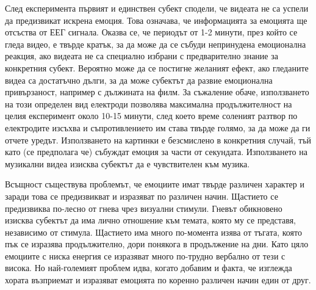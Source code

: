 \documentclass[main.tex]{subfiles}
\begin{document}
След експеримента първият и единствен субект сподели, че видеата не са успели да предизвикат искрена емоция. Това означава, че информацията за емоцията ще отсъства от ЕЕГ сигнала. Оказва се, че периодът от 1-2 минути, през който се гледа видео, е твърде кратък, за да може да се събуди непринудена емоционална реакция, ако видеата не са специално избрани с предварително знание за конкретния субект. Вероятно може да се постигне желаният ефект, ако гледаните видеа са достатъчно дълги, за да може субектът да развие емоционална привързаност, например с дължината на филм. За съжаление обаче, използването на този определен вид електроди позволява максимална продължителност на целия експеримент около 10-15 минути, след което време соленият разтвор по електродите изсъхва и съпротивлението им става твърде голямо, за да може да ги отчете уредът. Използването на картинки е безсмислено в конкретния случай, тъй като (се предполага че) събуждат емоция за части от секундата. Използването на музикални видеа изисква субектът да е чувствителен към музика. 

Всъщност съществува проблемът, че емоциите имат твърде различен характер и заради това се предизвикват и изразяват по различен начин. Щастието се предизвиква по-лесно от гнева чрез визуални стимули. Гневът обикновено изисква субектът да има лично отношение към темата, която му се представя, независимо от стимула. Щастието има много по-момента изява от тъгата, която пък се изразява продължително, дори понякога в продължение на дни. Като цяло емоциите с ниска енергия се изразяват много по-трудно вербално от тези с висока. Но най-големият проблем идва, когато добавим и факта, че изглежда хората възприемат и изразяват емоцията по коренно различен начин един от друг.
\end{document}
